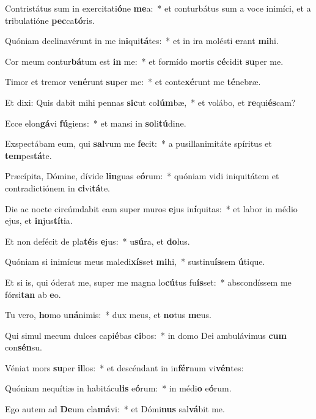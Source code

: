 \item Contristátus sum in exercitati\textbf{ó}ne \textbf{me}a:~* et conturbátus sum a voce inimíci, et a tribulatióne \textbf{pec}ca\textbf{tó}ris.
\item Quóniam declinavérunt in me in\textbf{i}qui\textbf{tá}tes:~* et in ira molésti \textbf{e}rant \textbf{mi}hi.
\item Cor meum contur\textbf{bá}tum est \textbf{in} me:~* et formído mortis \textbf{cé}cidit \textbf{su}per me.
\item Timor et tremor ve\textbf{né}runt \textbf{su}per me:~* et conte\textbf{xé}runt me \textbf{té}nebræ.
\item Et dixi: Quis dabit mihi pennas \textbf{sic}ut co\textbf{lúm}bæ,~* et volábo, et \textbf{re}qui\textbf{és}cam?
\item Ecce elon\textbf{gá}vi \textbf{fú}giens:~* et mansi in \textbf{so}li\textbf{tú}dine.
\item Exspectábam eum, qui \textbf{sal}vum me \textbf{fe}cit:~* a pusillanimitáte spíritus et \textbf{tem}pes\textbf{tá}te.
\item Præcípita, Dómine, dívide \textbf{lin}guas e\textbf{ó}rum:~* quóniam vidi iniquitátem et contradictiónem in \textbf{ci}vi\textbf{tá}te.
\item Die ac nocte circúmdabit eam super muros \textbf{e}jus in\textbf{í}quitas:~* et labor in médio ejus, et \textbf{in}jus\textbf{tí}tia.
\item Et non defécit de pla\textbf{té}is \textbf{e}jus:~* u\textbf{sú}ra, et \textbf{do}lus.
\item Quóniam si inimícus meus maledi\textbf{xís}set \textbf{mi}hi,~* sustinu\textbf{ís}sem \textbf{ú}tique.
\item Et si is, qui óderat me, super me magna lo\textbf{cú}tus fu\textbf{ís}set:~* abscondíssem me fórsi\textbf{tan} ab \textbf{e}o.
\item Tu vero, \textbf{ho}mo u\textbf{ná}nimis:~* dux meus, et \textbf{no}tus \textbf{me}us.
\item Qui simul mecum dulces capi\textbf{é}bas \textbf{ci}bos:~* in domo Dei ambulávimus \textbf{cum} con\textbf{sén}su.
\item Véniat mors \textbf{su}per \textbf{il}los:~* et descéndant in in\textbf{fér}num vi\textbf{vén}tes:
\item Quóniam nequítiæ in habitácu\textbf{lis} e\textbf{ó}rum:~* in médi\textbf{o} e\textbf{ó}rum.
\item Ego autem ad \textbf{De}um cla\textbf{má}vi:~* et Dómi\textbf{nus} sal\textbf{vá}bit me.
